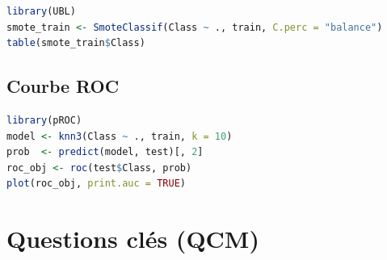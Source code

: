 \documentclass[a4paper,11pt]{article}
\theoremstyle{definition}
\theoremstyle{remark}
\begin{document}
\begin{lstlisting}[language=R]
library(UBL)
smote_train <- SmoteClassif(Class ~ ., train, C.perc = "balance")
table(smote_train$Class)
\end{lstlisting}

\subsection{Courbe ROC}

\begin{lstlisting}[language=R]
library(pROC)
model <- knn3(Class ~ ., train, k = 10)
prob  <- predict(model, test)[, 2]
roc_obj <- roc(test$Class, prob)
plot(roc_obj, print.auc = TRUE)
\end{lstlisting}

\newpage
\section*{Questions cl\'es (QCM)}
\end{document}

